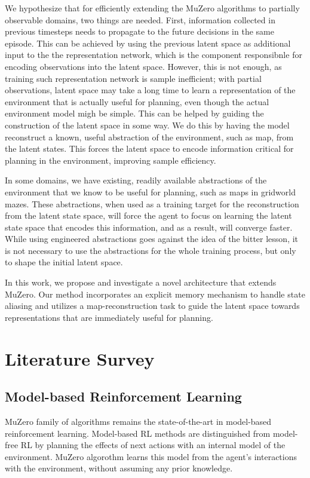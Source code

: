 \documentclass[12pt]{article}
\begin{document}
We hypothesize that for efficiently extending the MuZero algorithms to partially observable domains, two things are needed. 
First, information collected in previous timesteps needs to propagate to the future decisions in the same episode. This can be achieved by using the previous latent space as additional input to the the representation network, which is the component responsibnle for encoding observations into the latent space.
However, this is not enough, as training such representation network is sample inefficient; with partial observations,  latent space may take a long time to learn a representation of the environment that is actually useful for planning, even though the actual environment model migh be simple.  
This can be helped by guiding the construction of the latent space in some way. 
We do this by having the model reconstruct a known, useful abstraction of the environment, such as map, from the latent states. 
This forces the latent space to encode information critical for planning in the environment, improving sample efficiency. 

In some domains, we have existing, readily available abstractions of the environment that we know to be useful for planning, such as maps in gridworld mazes. 
These abstractions, when used as a training target for the reconstruction from the latent state space, will force the agent to focus on learning the latent state space that encodes this information, and as a result, will converge faster. 
While using engineered abstractions goes against the idea of the bitter lesson, it is not necessary to use the abstractions for the whole training process, but only to shape the initial latent space.

In this work, we propose and investigate a novel architecture that extends MuZero. Our method incorporates an explicit memory mechanism to handle state aliasing and utilizes a map-reconstruction task to guide the latent space towards representations that are immediately useful for planning.


\section{Literature Survey}

\subsection{Model-based Reinforcement Learning}
MuZero family of algorithms\cite{schrittwieserMasteringAtariGo2020,niuLightZeroUnifiedBenchmark2023} remains the state-of-the-art in model-based reinforcement learning. Model-based RL methods are distinguished from model-free RL by planning the effects of next actions with an internal model of the environment. 
MuZero algorothm learns this model from the agent's interactions with the environment, without assuming any prior knowledge. 
\end{document}
